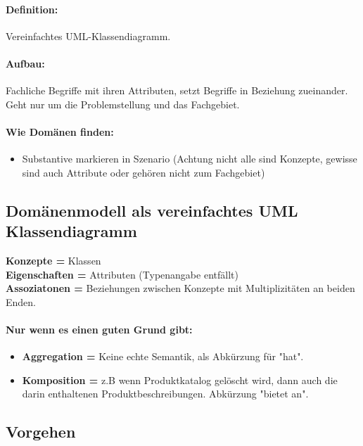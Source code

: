 \documentclass[../ZF_SWEN1.tex]{subfiles}
\begin{document}
\paragraph{Definition: } Vereinfachtes UML-Klassendiagramm.

\paragraph{Aufbau: } Fachliche Begriffe mit ihren Attributen, setzt Begriffe in Beziehung zueinander.\\
Geht nur um die Problemstellung und das Fachgebiet.

\paragraph{Wie Domänen finden:}
\begin{itemize}
	\item Substantive markieren in Szenario (Achtung nicht alle sind Konzepte, gewisse sind auch Attribute oder gehören nicht zum Fachgebiet)
\end{itemize}

\subsection{Domänenmodell als vereinfachtes UML Klassendiagramm}

\textbf{Konzepte = }Klassen \\
\textbf{Eigenschaften = }Attributen (Typenangabe entfällt) \\
\textbf{Assoziatonen = }Beziehungen zwischen Konzepte mit Multiplizitäten an beiden Enden.\\
\paragraph{Nur wenn es einen guten Grund gibt:\\}
\begin{itemize}
	\item \textbf{Aggregation = }Keine echte Semantik, als Abkürzung für "hat".
	\item \textbf{Komposition = }z.B wenn Produktkatalog gelöscht wird, dann auch die darin enthaltenen Produktbeschreibungen. Abkürzung "bietet an".
\end{itemize}



\subsection{Vorgehen}
\end{document}
